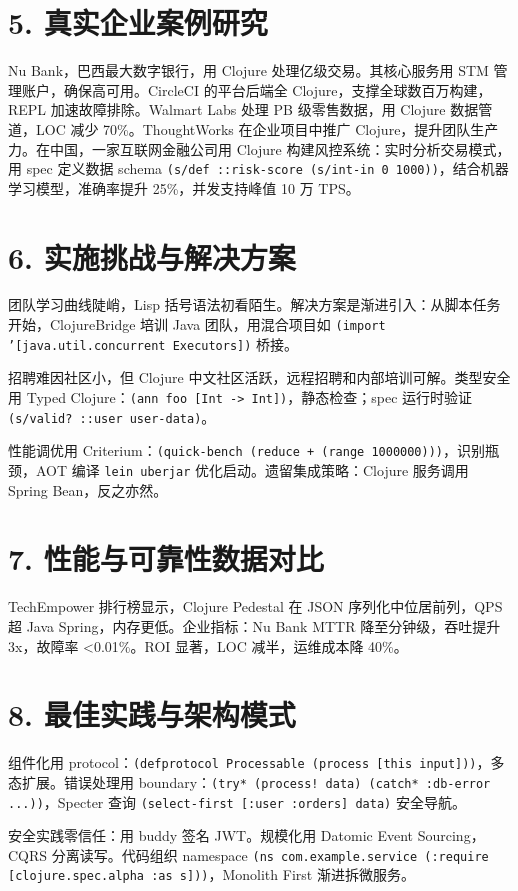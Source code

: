 \chapter{5. 真实企业案例研究}
Nu Bank，巴西最大数字银行，用 Clojure 处理亿级交易。其核心服务用 STM 管理账户，确保高可用。CircleCI 的平台后端全 Clojure，支撑全球数百万构建，REPL 加速故障排除。Walmart Labs 处理 PB 级零售数据，用 Clojure 数据管道，LOC 减少 70\%{}。ThoughtWorks 在企业项目中推广 Clojure，提升团队生产力。在中国，一家互联网金融公司用 Clojure 构建风控系统：实时分析交易模式，用 spec 定义数据 schema \texttt{(s/def ::risk-score (s/int-in 0 1000))}，结合机器学习模型，准确率提升 25\%{}，并发支持峰值 10 万 TPS。\par
\chapter{6. 实施挑战与解决方案}
团队学习曲线陡峭，Lisp 括号语法初看陌生。解决方案是渐进引入：从脚本任务开始，ClojureBridge 培训 Java 团队，用混合项目如 \texttt{(import '[java.util.concurrent Executors])} 桥接。\par
招聘难因社区小，但 Clojure 中文社区活跃，远程招聘和内部培训可解。类型安全用 Typed Clojure：\texttt{(ann foo [Int -> Int])}，静态检查；spec 运行时验证 \texttt{(s/valid? ::user user-data)}。\par
性能调优用 Criterium：\texttt{(quick-bench (reduce + (range 1000000)))}，识别瓶颈，AOT 编译 \texttt{lein uberjar} 优化启动。遗留集成策略：Clojure 服务调用 Spring Bean，反之亦然。\par
\chapter{7. 性能与可靠性数据对比}
TechEmpower 排行榜显示，Clojure Pedestal 在 JSON 序列化中位居前列，QPS 超 Java Spring，内存更低。企业指标：Nu Bank MTTR 降至分钟级，吞吐提升 3x，故障率 <0.01\%{}。ROI 显著，LOC 减半，运维成本降 40\%{}。\par
\chapter{8. 最佳实践与架构模式}
组件化用 protocol：\texttt{(defprotocol Processable (process [this input]))}，多态扩展。错误处理用 boundary：\texttt{(try* (process! data) (catch* :db-error ...))}，Specter 查询 \texttt{(select-first [:user :orders] data)} 安全导航。\par
安全实践零信任：用 buddy 签名 JWT。规模化用 Datomic Event Sourcing，CQRS 分离读写。代码组织 namespace \texttt{(ns com.example.service (:require [clojure.spec.alpha :as s]))}，Monolith First 渐进拆微服务。\par
